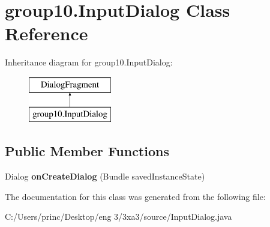 \hypertarget{classgroup10_1_1_input_dialog}{}\section{group10.\+Input\+Dialog Class Reference}
\label{classgroup10_1_1_input_dialog}
Inheritance diagram for group10.\+Input\+Dialog\+:\begin{figure}[H]
\begin{center}
\leavevmode
\includegraphics[height=2.000000cm]{classgroup10_1_1_input_dialog}
\end{center}
\end{figure}
\subsection*{Public Member Functions}
\begin{DoxyCompactItemize}
\item 
\mbox{\label{classgroup10_1_1_input_dialog_a95c3498b45e142b4c20ec2a5fb8d93f1}} 
Dialog {\bfseries on\+Create\+Dialog} (Bundle saved\+Instance\+State)
\end{DoxyCompactItemize}


The documentation for this class was generated from the following file\+:\begin{DoxyCompactItemize}
\item 
C\+:/\+Users/princ/\+Desktop/eng 3/3xa3/source/Input\+Dialog.\+java\end{DoxyCompactItemize}
